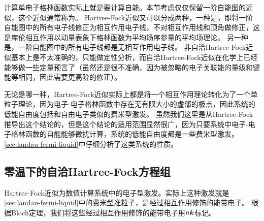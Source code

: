 计算单电子格林函数实际上就是要计算自能。本节考虑仅仅保留一阶自能图的近似，这个近似通常称为。
Hartree-Fock近似又可以分成两种，一种是，即将一阶自能图中的所有电子线修正为相互作用电子线，不对相互作用线和顶角做修正，这是库伦相互作用以动量表象下格林函数为平均场序参量的平均场理论。
另一种是，一阶自能图中的所有电子线都是无相互作用电子线。
非自洽Hartree-Fock近似基本上是不太准确的，只能做定性分析，而自洽Hartree-Fock近似在化学上已经能够做一些定量预言了（虽然还是很不准确，因为被忽略的电子关联能的量级和键能等相同，因此需要更高阶的修正）。

无论是哪一种，Hartree-Fock近似实际上都是将一个相互作用理论转化为了一个单粒子理论，因为电子-电子格林函数中存在无有限大小的虚部的极点，因此系统的低能自由度包括和自由电子类似的费米型激发。
虽然我们这里是从Hartree-Fock推导出这个结论的，但是这个结论的适用范围显然很广，因为只要系统中电子-电子格林函数的自能能够微扰计算，系统的低能自由度都是一些费米型激发。
\autoref{sec:landau-fermi-liquid}中仔细分析了这类系统的性质。

\subsection{零温下的自洽Hartree-Fock方程组}

Hartree-Fock近似为数值计算系统中的电子型激发。实际上这种激发就是\autoref{sec:landau-fermi-liquid}中的费米型准粒子，是经过相互作用修饰的能带电子。
根据Bloch定理，我们将这些经过相互作用修饰的能带电子用$n \vb*{k}$标记。

